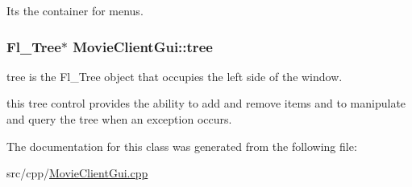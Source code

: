 Its the container for menus. \hypertarget{class_movie_client_gui_af36267d1a841d6f1953abb2fd1549085}{}
\subsubsection[{tree}]{\setlength{\rightskip}{0pt plus 5cm}Fl\+\_\+\+Tree$\ast$ Movie\+Client\+Gui\+::tree\hspace{0.3cm}{\ttfamily [protected]}}\label{class_movie_client_gui_af36267d1a841d6f1953abb2fd1549085}


tree is the Fl\+\_\+\+Tree object that occupies the left side of the window. 

this tree control provides the ability to add and remove items and to manipulate and query the tree when an exception occurs. 

The documentation for this class was generated from the following file\+:\begin{DoxyCompactItemize}
\item 
src/cpp/\hyperlink{_movie_client_gui_8cpp}{Movie\+Client\+Gui.\+cpp}\end{DoxyCompactItemize}
